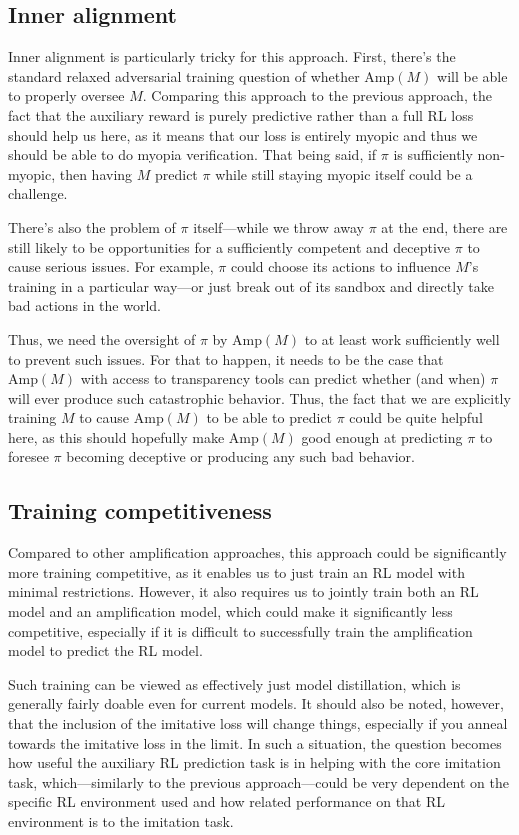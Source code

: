 \documentclass[
  onecolumn,
  natbib,
]{miri-tech-article}
\begin{document}
\subsection{Inner alignment} Inner alignment is particularly tricky for this approach. First, there's the standard relaxed adversarial training question of whether $\text{Amp}(M)$ will be able to properly oversee $M$. Comparing this approach to the previous approach, the fact that the auxiliary reward is purely predictive rather than a full RL loss should help us here, as it means that our loss is entirely myopic and thus we should be able to do myopia verification. That being said, if $\pi$ is sufficiently non-myopic, then having $M$ predict $\pi$ while still staying myopic itself could be a challenge.

There's also the problem of $\pi$ itself---while we throw away $\pi$ at the end, there are still likely to be opportunities for a sufficiently competent and deceptive $\pi$ to cause serious issues. For example, $\pi$ could choose its actions to influence $M$'s training in a particular way---or just break out of its sandbox and directly take bad actions in the world.

Thus, we need the oversight of $\pi$ by $\text{Amp}(M)$ to at least work sufficiently well to prevent such issues. For that to happen, it needs to be the case that $\text{Amp}(M)$ with access to transparency tools can predict whether (and when) $\pi$ will ever produce such catastrophic behavior. Thus, the fact that we are explicitly training $M$ to cause $\text{Amp}(M)$ to be able to predict $\pi$ could be quite helpful here, as this should hopefully make $\text{Amp}(M)$ good enough at predicting $\pi$ to foresee $\pi$ becoming deceptive or producing any such bad behavior.

\subsection{Training competitiveness} Compared to other amplification approaches, this approach could be significantly more training competitive, as it enables us to just train an RL model with minimal restrictions. However, it also requires us to jointly train both an RL model and an amplification model, which could make it significantly less competitive, especially if it is difficult to successfully train the amplification model to predict the RL model.

Such training can be viewed as effectively just model distillation, which is generally fairly doable even for current models. It should also be noted, however, that the inclusion of the imitative loss will change things, especially if you anneal towards the imitative loss in the limit. In such a situation, the question becomes how useful the auxiliary RL prediction task is in helping with the core imitation task, which---similarly to the previous approach---could be very dependent on the specific RL environment used and how related performance on that RL environment is to the imitation task.
\end{document}
